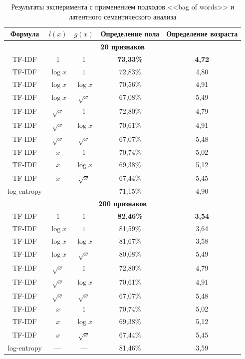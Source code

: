 \begin{table}[!h]
    \caption{Результаты эксперимента с применением подходов
            <<bag of words>> и латентного семантического анализа}
    \label{tab:bow_lsa}
\centering
\begin{tabular}{|c|c|c|c|c|}\hline
    \textbf{Формула} & \boldmath$l(x)$ & \boldmath$g(x)$ & \textbf{Определение пола} & \textbf{Определение возраста} \\\hline
    \multicolumn{5}{|c|}{\textbf{20 признаков}} \\\hline
    TF-IDF & $1$ & $1$ & \textbf{73,33\%} & \textbf{4,72} \\\hline
    TF-IDF & $\log{x}$ & $1$ & 72,83\% & 4,80 \\\hline
    TF-IDF & $\log{x}$ & $\log{x}$ & 70,56\% & 4,91 \\\hline
    TF-IDF & $\log{x}$ & $\sqrt{x}$ & 67,08\% & 5,49 \\\hline
    TF-IDF & $\sqrt{x}$ & $1$ & 72,80\% & 4,79 \\\hline
    TF-IDF & $\sqrt{x}$ & $\log{x}$ & 70,61\% & 4,91 \\\hline
    TF-IDF & $\sqrt{x}$ & $\sqrt{x}$ & 67,07\% & 5,48 \\\hline
    TF-IDF & $x$ & $1$ & 70,74\% & 5,02 \\\hline
    TF-IDF & $x$ & $\log{x}$ & 69,38\% & 5,12 \\\hline
    TF-IDF & $x$ & $\sqrt{x}$ & 67,44\% & 5,45 \\\hline
    log-entropy & --- & --- & 71,15\% & 4,90 \\\hline
    \multicolumn{5}{|c|}{\textbf{200 признаков}} \\\hline
    TF-IDF & $1$ & $1$ & \textbf{82,46\%} & \textbf{3,54} \\\hline
    TF-IDF & $\log{x}$ & $1$ & 81,59\% & 3,64 \\\hline
    TF-IDF & $\log{x}$ & $\log{x}$ & 81,67\% & 3,58 \\\hline
    TF-IDF & $\log{x}$ & $\sqrt{x}$ & 80,08\% & 5,49 \\\hline
    TF-IDF & $\sqrt{x}$ & $1$ & 72,80\% & 4,79 \\\hline
    TF-IDF & $\sqrt{x}$ & $\log{x}$ & 70,61\% & 4,91 \\\hline
    TF-IDF & $\sqrt{x}$ & $\sqrt{x}$ & 67,07\% & 5,48 \\\hline
    TF-IDF & $x$ & $1$ & 70,74\% & 5,02 \\\hline
    TF-IDF & $x$ & $\log{x}$ & 69,38\% & 5,12 \\\hline
    TF-IDF & $x$ & $\sqrt{x}$ & 67,44\% & 5,45 \\\hline
    log-entropy & --- & --- & 81,46\% & 3,59 \\\hline
\end{tabular}
\end{table}

